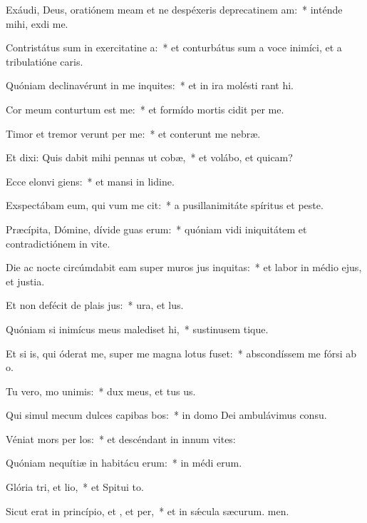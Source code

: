 \item Exáudi, Deus, oratiónem meam et ne despéxeris deprecatinem am:~* inténde mihi,  exdi me.
\item Contristátus sum in exercitatine a:~* et conturbátus sum a voce inimíci, et a tribulatióne caris.
\item Quóniam declinavérunt in me inquites:~* et in ira molésti rant hi.
\item Cor meum conturtum est  me:~* et formído mortis cidit per me.
\item Timor et tremor verunt per me:~* et conterunt me nebræ.
\item Et dixi: Quis dabit mihi pennas ut cobæ,~* et volábo, et quicam?
\item Ecce elonvi giens:~* et mansi in lidine.
\item Exspectábam eum, qui vum me cit:~* a pusillanimitáte spíritus et peste.
\item Præcípita, Dómine, dívide guas erum:~* quóniam vidi iniquitátem et contradictiónem in vite.
\item Die ac nocte circúmdabit eam super muros jus inquitas:~* et labor in médio ejus, et justia.
\item Et non defécit de plais jus:~* ura, et lus.
\item Quóniam si inimícus meus malediset hi,~* sustinusem tique.
\item Et si is, qui óderat me, super me magna lotus fuset:~* abscondíssem me fórsi ab o.
\item Tu vero, mo unimis:~* dux meus, et tus us.
\item Qui simul mecum dulces capibas bos:~* in domo Dei ambulávimus  consu.
\item Véniat mors per los:~* et descéndant in innum vites:
\item Quóniam nequítiæ in habitácu erum:~* in médi erum.
\item Glória tri, et lio,~* et Spitui to.
\item Sicut erat in princípio, et , et per,~* et in sǽcula sæcurum. men.
